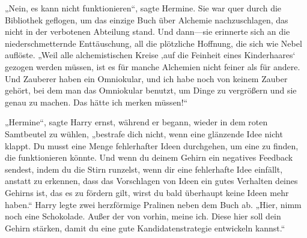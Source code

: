„Nein, es kann nicht funktionieren“, sagte Hermine. Sie war quer durch die Bibliothek geflogen, um das einzige Buch über Alchemie nachzuschlagen, das nicht in der verbotenen Abteilung stand. Und dann—sie erinnerte sich an die niederschmetternde Enttäuschung, all die plötzliche Hoffnung, die sich wie Nebel auflöste. „Weil alle alchemistischen Kreise ‚auf die Feinheit eines Kinderhaares‘ gezogen werden müssen, ist es für manche Alchemien nicht feiner als für andere. Und Zauberer haben ein Omniokular, und ich habe noch von keinem Zauber gehört, bei dem man das Omniokular benutzt, um Dinge zu vergrößern und sie genau zu machen. Das hätte ich merken müssen!“

„Hermine“, sagte Harry ernst, während er begann, wieder in dem roten Samtbeutel zu wühlen, „bestrafe dich nicht, wenn eine glänzende Idee nicht klappt. Du musst eine Menge fehlerhafter Ideen durchgehen, um eine zu finden, die funktionieren könnte. Und wenn du deinem Gehirn ein negatives Feedback sendest, indem du die Stirn runzelst, wenn dir eine fehlerhafte Idee einfällt, anstatt zu erkennen, dass das Vorschlagen von Ideen ein gutes Verhalten deines Gehirns ist, das es zu fördern gilt, wirst du bald überhaupt keine Ideen mehr haben.“
Harry legte zwei herzförmige Pralinen neben dem Buch ab.
„Hier, nimm noch eine Schokolade. Außer der von vorhin, meine ich. Diese hier soll dein Gehirn stärken, damit du eine gute Kandidatenstrategie entwickeln kannst.“

